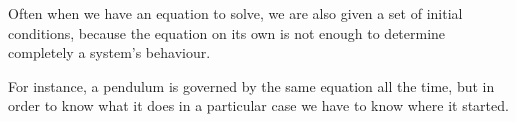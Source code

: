 Often when we have an equation to solve, we are
also given a set of initial conditions, because
the equation on its own is not enough to determine
completely a system's behaviour.
\par
For instance, a pendulum is governed by the same
equation all the time, but in order to know what 
it does in a particular case we have to know where
it started.